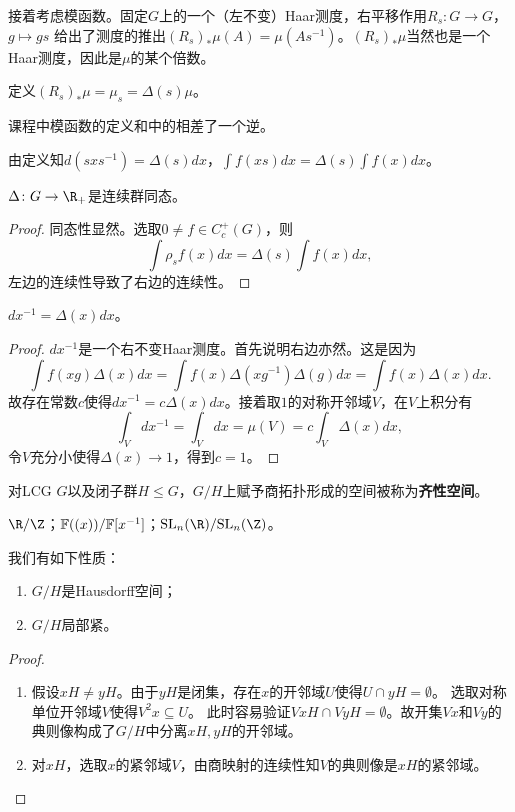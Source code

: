 接着考虑模函数。固定$G$上的一个（左不变）Haar测度，右平移作用$R_s \colon G \to G$，$g \mapsto gs$
给出了测度的推出$(R_s)_*\mu(A) = \mu(As^{-1})$。$(R_s)_*\mu$当然也是一个Haar测度，因此是$\mu$的某个倍数。
\begin{definition}
    定义$(R_s)_*\mu = \mu_s = \Delta(s)\mu$。
\end{definition}
\begin{remark}
    课程中模函数的定义和\cite{Pr}中的相差了一个逆。
\end{remark}
由定义知$d(sxs^{-1}) = \Delta(s)dx$，$\displaystyle \int f(xs) dx = \Delta(s) \int f(x) dx$。
\begin{proposition}
    $\Delta \colon G \to \R_+$是连续群同态。
\end{proposition}
\begin{proof}
同态性显然。选取$0 \neq f \in C_c^+(G)$，则
\[\int \rho_sf(x) dx = \Delta(s)\int f(x) dx,\]
左边的连续性导致了右边的连续性。
\end{proof}
\begin{theorem}
    $dx^{-1} = \Delta(x)dx$。
\end{theorem}
\begin{proof}
    $dx^{-1}$是一个右不变Haar测度。首先说明右边亦然。这是因为
    \[\int f(xg) \Delta(x)dx = \int f(x)\Delta(xg^{-1})\Delta(g)dx = \int f(x) \Delta(x)dx.\]
    故存在常数$c$使得$dx^{-1} = c\Delta(x)dx$。接着取$1$的对称开邻域$V$，在$V$上积分有
    \[\int_V dx^{-1} = \int_V dx = \mu(V) = c\int_V \Delta(x) dx,\]
    令$V$充分小使得$\Delta(x) \to 1$，得到$c = 1$。
\end{proof}
\begin{definition}
    对LCG $G$以及闭子群$H \leqslant G$，$G/H$上赋予商拓扑形成的空间被称为\textbf{齐性空间}。
\end{definition}
\begin{example}
    $\R/\Z$；$\mathbb{F}((x))/\mathbb{F}[x^{-1}]$；$\mathrm{SL}_n(\R)/\mathrm{SL}_n(\Z)$。
\end{example}
我们有如下性质：
\begin{proposition}
    \begin{enumerate}
        \item $G/H$是Hausdorff空间；
        \item $G/H$局部紧。
    \end{enumerate}
\end{proposition}
\begin{proof}
    \begin{enumerate}
        \item 假设$xH \neq yH$。由于$yH$是闭集，存在$x$的开邻域$U$使得$U \cap yH = \emptyset$。
        选取对称单位开邻域$V$使得$V^2x \subseteq U$。
        此时容易验证$VxH \cap VyH = \emptyset$。故开集$Vx$和$Vy$的典则像构成了$G/H$中分离$xH,yH$的开邻域。
        \item 对$xH$，选取$x$的紧邻域$V$，由商映射的连续性知$V$的典则像是$xH$的紧邻域。\qedhere
    \end{enumerate}
\end{proof}

